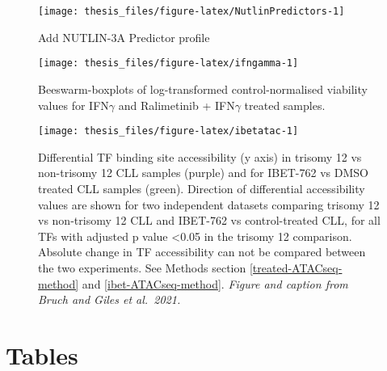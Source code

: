 \documentclass[11pt, a4paper, twosided]{book}
\begin{document}
\begin{figure}

{\centering \texttt{[image: thesis\_files/figure-latex/NutlinPredictors-1]} 

}

\caption{Add NUTLIN-3A Predictor profile}\label{fig:NutlinPredictors}
\end{figure}

\begin{figure}

{\centering \texttt{[image: thesis\_files/figure-latex/ifngamma-1]} 

}

\caption{Beeswarm-boxplots of log-transformed control-normalised viability values for IFN\(\gamma\) and Ralimetinib + IFN\(\gamma\) treated samples.}\label{fig:ifngamma}
\end{figure}





\begin{figure}

{\centering \texttt{[image: thesis\_files/figure-latex/ibetatac-1]} 

}

\caption{Differential TF binding site accessibility (y axis) in trisomy 12 vs non-trisomy 12 CLL samples (purple) and for IBET-762 vs DMSO treated CLL samples (green). Direction of
differential accessibility values are shown for two independent datasets comparing trisomy 12
vs non-trisomy 12 CLL and IBET-762 vs control-treated CLL, for all TFs with adjusted p value
\textless0.05 in the trisomy 12 comparison. Absolute change in TF accessibility can not be compared
between the two experiments. See Methods section \ref{treated-ATACseq-method} and \ref{ibet-ATACseq-method}. \emph{Figure and caption from Bruch and Giles et al.~2021.}}\label{fig:ibetatac}
\end{figure}
\hypertarget{tables}{%
\section*{Tables}\label{tables}}
\end{document}
